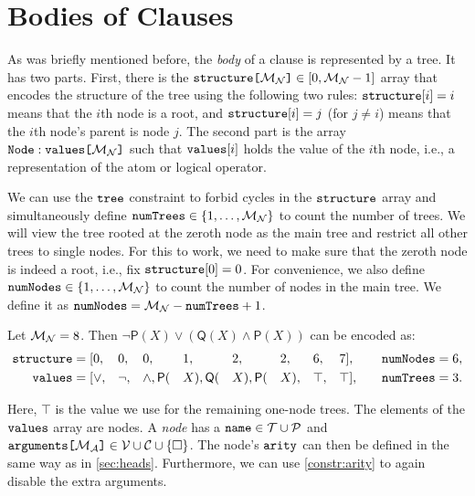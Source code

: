 \section{Bodies of Clauses} \label{sec:bodies}

As was briefly mentioned before, the \emph{body} of a clause is represented by a
tree. It has two parts. First, there is the
$\arrayd{structure}{\maxNumNodes{}}{[0, \maxNumNodes{} - 1]}$ array that encodes
the structure of the tree using the following two rules:
$\variable{structure}[i] = i$ means that the $i$th node is a root, and
$\variable{structure}[i] = j$ (for $j \ne i$) means that the $i$th node's
parent is node $j$. The second part is the array
$\arrayt{values}{\maxNumNodes{}}{Node}$ such that $\variable{values}[i]$ holds
the value of the $i$th node, i.e., a representation of the atom or logical
operator.

We can use the $\variable{tree}$ constraint \citep{DBLP:conf/cp/FagesL11} to
forbid cycles in the $\variable{structure}$ array and simultaneously define
$\variable{numTrees} \in \{ 1, \dots, \maxNumNodes{} \}$ to count the number of
trees. We will view the tree rooted at the zeroth node as the main tree and
restrict all other trees to single nodes. For this to work, we need to make sure
that the zeroth node is indeed a root, i.e., fix $\variable{structure}[0] = 0$.
For convenience, we also define $\variable{numNodes} \in \{ 1, \dots,
\maxNumNodes{} \}$ to count the number of nodes in the main tree. We define it
as $\variable{numNodes} = \maxNumNodes{} - \variable{numTrees} + 1$.

\begin{example} \label{example:formula}
  Let $\maxNumNodes{} = 8$. Then $\neg\mathsf{P}(X) \lor (\mathsf{Q}(X) \land
  \mathsf{P}(X))$ can be encoded as:
  \begin{alignat*}{9}
    \variable{structure} &= [0, &&0, &&0, &&1, &&2, &&2, &&6, &&7], \quad
    &&\variable{numNodes} = 6, \\
    \variable{values} &= [{\lor}, &&{\neg}, &&{\land}, \mathsf{P}(&&X),
    \mathsf{Q}(&&X), \mathsf{P}(&&X), &&\top, &&\top], \quad
    &&\variable{numTrees} = 3.
  \end{alignat*}
\end{example}

Here, $\top$ is the value we use for the remaining one-node trees. The
elements of the $\variable{values}$ array are nodes. A \emph{node} has a
$\variable{name} \in \tokens{} \cup \predicates{}$ and
$\arrayd{arguments}{\maxArity{}}{\variables{} \cup \constants{} \cup \{ \Box
  \}}$. The node's $\variable{arity}$ can then be defined in the same way as in
\cref{sec:heads}. Furthermore, we can use \cref{constr:arity} to again disable
the extra arguments.

